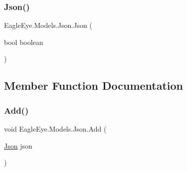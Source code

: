 \mbox{\label{class_eagle_eye_1_1_models_1_1_json_ae12564ad6ef249ccd5bbdd57560db23d}} 
\subsubsection{\texorpdfstring{Json()}{Json()}\hspace{0.1cm}{\footnotesize\ttfamily [4/4]}}
{\footnotesize\ttfamily Eagle\+Eye.\+Models.\+Json.\+Json (\begin{DoxyParamCaption}\item[{bool}]{boolean }\end{DoxyParamCaption})}



\subsection{Member Function Documentation}
\mbox{\label{class_eagle_eye_1_1_models_1_1_json_a4b23b3ec238276219d3d953b385fac93}} 
\subsubsection{\texorpdfstring{Add()}{Add()}}
{\footnotesize\ttfamily void Eagle\+Eye.\+Models.\+Json.\+Add (\begin{DoxyParamCaption}\item[{\mbox{\hyperlink{class_eagle_eye_1_1_models_1_1_json}{Json}}}]{json }\end{DoxyParamCaption})}





